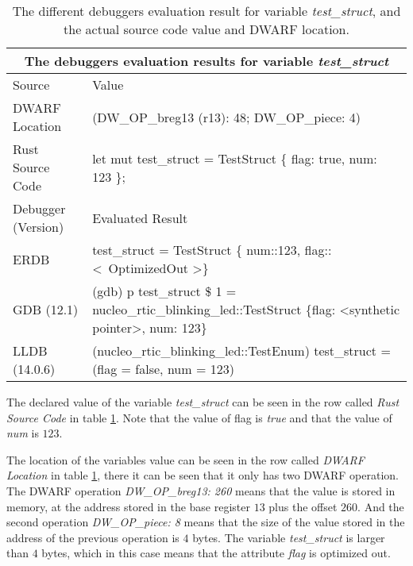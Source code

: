 \begin{table}[h]
	\centering
	\small
	\begin{tabular}{ |p{2cm}|p{8cm}|  }
		\hline
		\multicolumn{2}{|c|}{\textbf{The debuggers evaluation results for variable \emph{test\_struct}}} \\ 
		\hline
		\hline
		Source & Value \\
		\hline

		DWARF Location & (DW\_OP\_breg13 (r13): 48; DW\_OP\_piece: 4) \\

		Rust Source Code & let mut test\_struct = TestStruct \{ flag: true, num: 123 \}; \\
		\hline
		\hline
		Debugger (Version) & Evaluated Result \\
		\hline
		ERDB & test\_struct = TestStruct \{ num::123, flag::\textless \ OptimizedOut \textgreater \} \\

		GDB (12.1)  & (gdb) p test\_struct\newline
		\$ 1 = nucleo\_rtic\_blinking\_led::TestStruct \{flag: \textless synthetic pointer\textgreater, num: 123\} \\

		LLDB (14.0.6) & (nucleo\_rtic\_blinking\_led::TestEnum) test\_struct = (flag = false, num = 123) \\
		\hline
	\end{tabular}
	\caption{The different debuggers evaluation result for variable \emph{test\_struct}, and the actual source code value and DWARF location.}
	\label{table:struct}
\end{table}


The declared value of the variable \emph{test\_struct} can be seen in the row called \emph{Rust Source Code} in table \ref{table:struct}.
Note that the value of flag is \emph{true} and that the value of \emph{num} is $123$.


The location of the variables value can be seen in the row called \emph{DWARF Location} in table \ref{table:struct}, there it can be seen that it only has two \gls{DWARF} operation.
The \gls{DWARF} operation \emph{DW\_OP\_breg13: 260} means that the value is stored in memory, at the address stored in the base register $13$ plus the offset $260$. 
And the second operation \emph{DW\_OP\_piece: 8} means that the size of the value stored in the address of the previous operation is $4$ bytes.
The variable \emph{test\_struct} is larger than $4$ bytes, which in this case means that the attribute \emph{flag} is optimized out.


